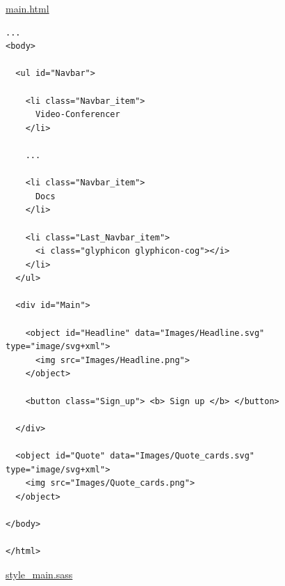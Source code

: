 \underline{main.html}

\begin{verbatim}
...
<body>

  <ul id="Navbar">

    <li class="Navbar_item">
      Video-Conferencer
    </li>

    ...

    <li class="Navbar_item">
      Docs
    </li>

    <li class="Last_Navbar_item">
      <i class="glyphicon glyphicon-cog"></i>
    </li>
  </ul>

  <div id="Main">

    <object id="Headline" data="Images/Headline.svg" type="image/svg+xml">
      <img src="Images/Headline.png">
    </object>

    <button class="Sign_up"> <b> Sign up </b> </button>

  </div>

  <object id="Quote" data="Images/Quote_cards.svg" type="image/svg+xml">
    <img src="Images/Quote_cards.png">
  </object>

</body>

</html>
\end{verbatim}

\underline{style\_main.sass}

